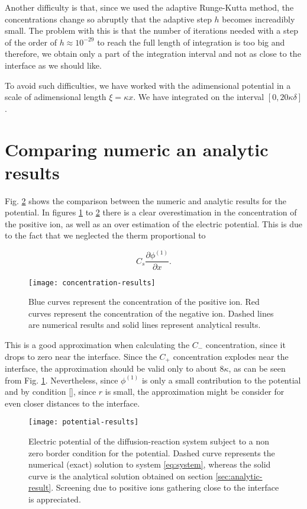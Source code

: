Another difficulty is that, since we used the adaptive Runge-Kutta method, the concentrations change so abruptly that the adaptive step $h$ becomes increadibly small. The problem with this is that the number of iterations needed with a step of the order of $h\approx 10^{-29}$ to reach the full length of integration is too big and therefore, we obtain only a part of the integration interval and not as close to the interface as we should like. 

To avoid such difficulties, we have worked with the adimensional potential in a scale of adimensional length $\xi = \kappa x$. We have integrated on the interval $[0, 20 \kappa \delta]$.



\newpage

\section*{Comparing numeric an analytic results}

Fig. \ref{fig:numerical-phi} shows the comparison between the numeric and analytic results for the potential. In figures \ref{fig:results-c} to  \ref{fig:numerical-phi} there is a clear overestimation in the concentration of the positive ion, as well as an over estimation of the electric potential. This is due to the fact that we neglected the therm proportional to 

$$C_s \frac{\partial \phi^{(1)}}{\partial x}.$$ 


\begin{figure}[h!]
 \centering
\texttt{[image: concentration-results]}
 \caption{Blue curves represent the concentration of the positive ion. Red curves represent the concentration of the negative ion. Dashed lines are numerical results and solid lines represent analytical results.}
 \label{fig:results-c}
\end{figure}


This is a good approximation when calculating the $C_-$ concentration, since it drops to zero near the interface. Since the $C_+$ concentration explodes near the interface, the approximation should be valid only to about $8\kappa$, as can be seen from Fig. \ref{fig:results-c}. Nevertheless, since $\phi^{(1)}$ is only a small contribution to the potential and by condition \ref{}, since $r$ is small, the approximation might be consider for even closer distances to the interface.


\begin{figure}[h!]
 \centering
\texttt{[image: potential-results]}
 \caption{Electric potential of the diffusion-reaction system subject to a non zero border condition for the potential. Dashed curve represents the numerical (exact) solution to system \ref{eq:system}, whereas the solid curve is the analytical solution obtained on section \ref{sec:analytic-result}. Screening due to positive ions gathering close to the interface is appreciated.}
 \label{fig:numerical-phi}
\end{figure}

